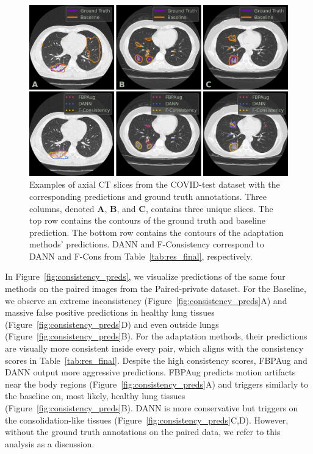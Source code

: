 \begin{figure}[h]
	\centering
	\includegraphics[width=\textwidth]{Dissertation/Figures/3_ct/test_preds.png}
	\caption{Examples of axial CT slices from the COVID-test dataset with the corresponding predictions and ground truth annotations. Three columns, denoted \textbf{A}, \textbf{B}, and \textbf{C}, contains three unique slices. The top row contains the contours of the ground truth and baseline prediction. The bottom row contains the contours of the adaptation methods' predictions. DANN and F-Consistency correspond to DANN and F-Cons from Table~\ref{tab:res_final}, respectively.\label{fig:test_preds}}
\end{figure}

In Figure~\ref{fig:consistency_preds}, we visualize predictions of the same four methods on the paired images from the Paired-private dataset. For the Baseline, we observe an extreme inconsistency (Figure~\ref{fig:consistency_preds}A) and massive false positive predictions in healthy lung tissues (Figure~\ref{fig:consistency_preds}D) and even outside lungs (Figure~\ref{fig:consistency_preds}B). For the adaptation methods, their predictions are visually more consistent inside every pair, which aligns with the consistency scores in Table~\ref{tab:res_final}.  Despite the high consistency scores, FBPAug and DANN output more aggressive predictions. FBPAug predicts motion artifacts near the body regions (Figure~\ref{fig:consistency_preds}A) and triggers similarly to the baseline on, most likely, healthy lung tissues (Figure~\ref{fig:consistency_preds}B). DANN is more conservative but triggers on the consolidation-like tissues (Figure~\ref{fig:consistency_preds}C,D). However, without the ground truth annotations on the paired data, we refer to this analysis as a discussion.

